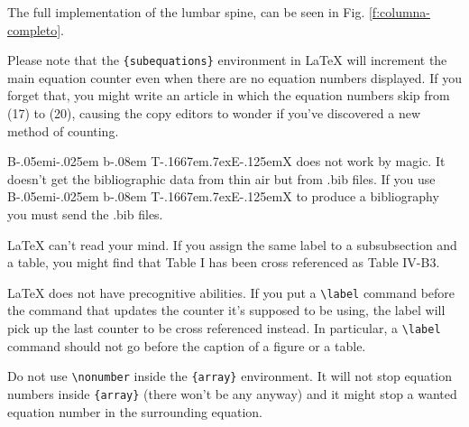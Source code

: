 \documentclass[conference]{IEEEtran}
\def\BibTeX{{\rm B\kern-.05em{\sc i\kern-.025em b}\kern-.08em
    T\kern-.1667em\lower.7ex\hbox{E}\kern-.125emX}}
\begin{document}
The full implementation of the lumbar spine, can be seen in Fig. \ref{f:columna-completo}.

Please note that the \verb|{subequations}| environment in {\LaTeX}
will increment the main equation counter even when there are no
equation numbers displayed. If you forget that, you might write an
article in which the equation numbers skip from (17) to (20), causing
the copy editors to wonder if you've discovered a new method of
counting.

{\BibTeX} does not work by magic. It doesn't get the bibliographic
data from thin air but from .bib files. If you use {\BibTeX} to produce a
bibliography you must send the .bib files. 

{\LaTeX} can't read your mind. If you assign the same label to a
subsubsection and a table, you might find that Table I has been cross
referenced as Table IV-B3. 

{\LaTeX} does not have precognitive abilities. If you put a
\verb|\label| command before the command that updates the counter it's
supposed to be using, the label will pick up the last counter to be
cross referenced instead. In particular, a \verb|\label| command
should not go before the caption of a figure or a table.

Do not use \verb|\nonumber| inside the \verb|{array}| environment. It
will not stop equation numbers inside \verb|{array}| (there won't be
any anyway) and it might stop a wanted equation number in the
surrounding equation.
\end{document}
